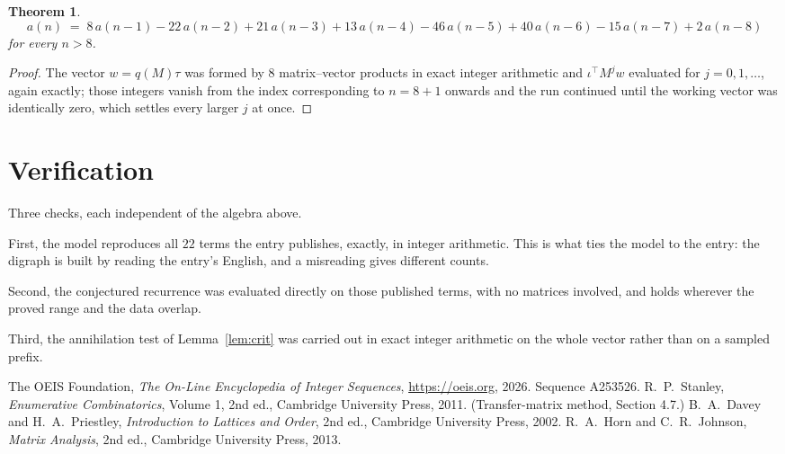 \documentclass[11pt,a4paper]{article}
\theoremstyle{plain}
\newtheorem{theorem}{Theorem}
\theoremstyle{definition}
\begin{document}
\begin{theorem}
\[
a(n)\;=\;8\,a(n-1) - 22\,a(n-2) + 21\,a(n-3) + 13\,a(n-4) - 46\,a(n-5) + 40\,a(n-6) - 15\,a(n-7) + 2\,a(n-8)
\]
for every $n>8$.
\end{theorem}

\begin{proof}
The vector $w=q(M)\tau$ was formed by $8$ matrix--vector products in exact integer
arithmetic and $\iota^{\!\top}M^{j}w$ evaluated for $j=0,1,\dots$, again exactly; those
integers vanish from the index corresponding to $n=8+1$ onwards and the run continued
until the working vector was identically zero, which settles every larger $j$ at once.
\end{proof}

\section{Verification}

Three checks, each independent of the algebra above.

First, the model reproduces all $22$ terms the entry publishes, exactly, in integer
arithmetic. This is what ties the model to the entry: the digraph is built by reading the
entry's English, and a misreading gives different counts.

Second, the conjectured recurrence was evaluated directly on those published terms, with no
matrices involved, and holds wherever the proved range and the data overlap.

Third, the annihilation test of Lemma~\ref{lem:crit} was carried out in exact integer
arithmetic on the whole vector rather than on a sampled prefix.

\begin{thebibliography}{9}
 The OEIS Foundation, \emph{The On-Line Encyclopedia of Integer
Sequences}, \url{https://oeis.org}, 2026. Sequence A253526.
 R.~P.~Stanley, \emph{Enumerative Combinatorics}, Volume 1, 2nd ed.,
Cambridge University Press, 2011. (Transfer-matrix method, Section 4.7.)
 B.~A.~Davey and H.~A.~Priestley, \emph{Introduction to Lattices and
Order}, 2nd ed., Cambridge University Press, 2002.
 R.~A.~Horn and C.~R.~Johnson, \emph{Matrix Analysis}, 2nd ed., Cambridge
University Press, 2013.
\end{thebibliography}
\end{document}
